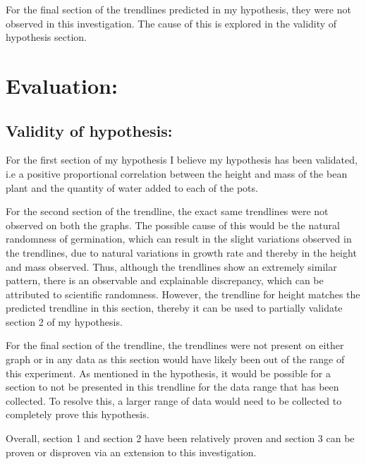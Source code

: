 \documentclass[11pt, a4]{article}
\begin{document}
			\bigbreak

		For the final section of the trendlines predicted in my hypothesis, they were not observed in this investigation. The cause of this is explored in the validity of hypothesis section.

	\section{Evaluation:}
		\subsection{Validity of hypothesis:}
			For the first section of my hypothesis I believe my hypothesis has been validated, i.e a positive proportional correlation between the height and mass of the bean plant and the quantity of water added to each of the pots.

			\bigbreak
			
			For the second section of the trendline, the exact same trendlines were not observed on both the graphs. The possible cause of this would be the natural randomness of germination, which can result in the slight variations observed in the trendlines, due to natural variations in growth rate and thereby in the height and mass observed. Thus, although the trendlines show an extremely similar pattern, there is an observable and explainable discrepancy, which can be attributed to scientific randomness. However, the trendline for height matches the predicted trendline in this section, thereby it can be used to partially validate section 2 of my hypothesis.

			\bigbreak
			
			For the final section of the trendline, the trendlines were not present on either graph or in any data as this section would have likely been out of the range of this experiment. As mentioned in the hypothesis, it would be possible for a section to not be presented in this trendline for the data range that has been collected. To resolve this, a larger range of data would need to be collected to completely prove this hypothesis.

			\bigbreak

			Overall, section 1 and section 2 have been relatively proven and section 3 can be proven or disproven via an extension to this investigation.
\end{document}
